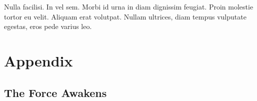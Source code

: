 \graphicspath{{figures/appendix/}}


\begin{savequote}[75mm]
Nulla facilisi. In vel sem. Morbi id urna in diam dignissim feugiat. Proin molestie tortor eu velit. Aliquam erat volutpat. Nullam    ultrices, diam tempus vulputate egestas, eros pede varius leo.
\end{savequote}

\chapter{Appendix}
		\label{appendix}


\section{The Force Awakens}

\lipsum[50-55]\cite{Drewitt2015}



